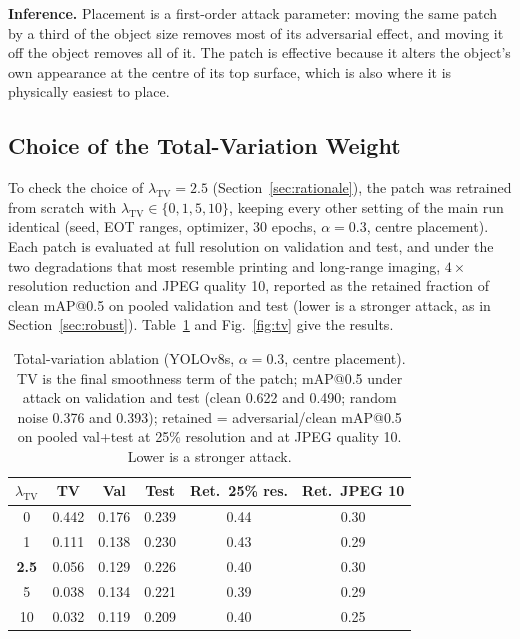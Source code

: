 \documentclass[conference]{IEEEtran}
\begin{document}
\textbf{Inference.} Placement is a first-order attack parameter: moving the same patch by a
third of the object size removes most of its adversarial effect, and moving it off the object
removes all of it. The patch is effective because it alters the object's own appearance at the
centre of its top surface, which is also where it is physically easiest to place.

\subsection{Choice of the Total-Variation Weight}
\label{sec:tv}
To check the choice of $\lambda_{\text{TV}}=2.5$ (Section~\ref{sec:rationale}), the patch was
retrained from scratch with $\lambda_{\text{TV}}\in\{0,1,5,10\}$, keeping every other setting
of the main run identical (seed, EOT ranges, optimizer, 30 epochs, $\alpha=0.3$, centre
placement). Each patch is evaluated at full resolution on validation and test, and under the
two degradations that most resemble printing and long-range imaging, $4\times$ resolution
reduction and JPEG quality 10, reported as the retained fraction of clean mAP@0.5 on pooled
validation and test (lower is a stronger attack, as in Section~\ref{sec:robust}).
Table~\ref{tab:tv} and Fig.~\ref{fig:tv} give the results.

\begin{table}[t]
\centering
\caption{Total-variation ablation (YOLOv8s, $\alpha=0.3$, centre placement). TV is the final
smoothness term of the patch; mAP@0.5 under attack on validation and test (clean 0.622 and
0.490; random noise 0.376 and 0.393); retained = adversarial/clean mAP@0.5 on pooled
val+test at 25\% resolution and at JPEG quality 10. Lower is a stronger attack.}
\label{tab:tv}
\setlength{\tabcolsep}{4pt}
\begin{tabular}{cccccc}
\toprule
$\lambda_{\text{TV}}$ & TV & Val & Test & Ret.\ 25\% res. & Ret.\ JPEG 10 \\
\midrule
0    & 0.442 & 0.176 & 0.239 & 0.44 & 0.30 \\
1    & 0.111 & 0.138 & 0.230 & 0.43 & 0.29 \\
\textbf{2.5} & 0.056 & 0.129 & 0.226 & 0.40 & 0.30 \\
5    & 0.038 & 0.134 & 0.221 & 0.39 & 0.29 \\
10   & 0.032 & 0.119 & 0.209 & 0.40 & 0.25 \\
\bottomrule
\end{tabular}
\end{table}
\end{document}
